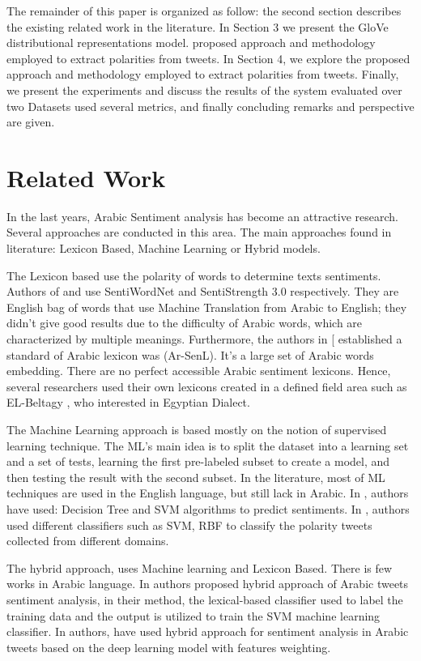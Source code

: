 \documentclass[conference]{IEEEtran}
\begin{document}
	The remainder of this paper is organized as follow: the second section describes the existing related work in the literature. In Section 3 we present the GloVe distributional representations model. proposed approach and methodology employed to extract polarities from tweets. In Section 4, we explore the proposed approach and methodology employed to extract polarities from tweets. Finally, we present the experiments and discuss the results of the system evaluated over two Datasets used several metrics, and finally concluding remarks and perspective are given.
	
	
	\section{Related Work}
	
	
	In the last years, Arabic Sentiment analysis has become an attractive research. Several approaches are conducted in   this area. The main approaches found in literature:  Lexicon Based, Machine Learning or Hybrid models. 
	
	The Lexicon based use the polarity of words to determine texts sentiments. Authors of \cite{8549704} and \cite{7975223} use SentiWordNet and SentiStrength 3.0 respectively. They are English bag of words that use Machine Translation from Arabic to English; they didn’t give good results due to the difficulty of Arabic words, which are characterized by multiple meanings. Furthermore, the authors in [\cite{8125054} established a standard of Arabic lexicon was (Ar-SenL). It’s a large set of Arabic words embedding. There are no perfect accessible Arabic sentiment lexicons. Hence, several researchers used their own lexicons created in a defined field area such as EL-Beltagy \cite{6544421}, who interested in Egyptian Dialect.
	
	The Machine Learning approach is based mostly on the notion of supervised learning technique. The ML's main idea is to split the dataset into a learning set and a set of tests, learning the first pre-labeled subset to create a model, and then testing the result with the second subset. In the literature, most of ML techniques are used in the English language, but still lack in Arabic. In \cite{8530517}, authors have used: Decision Tree and SVM algorithms to predict sentiments. In \cite{7514636}, authors used different classifiers such as SVM, RBF to classify the polarity tweets collected from different domains. 
	
	The hybrid approach, uses Machine learning and Lexicon Based. There is few works in Arabic language. In \cite{8250273} authors proposed hybrid approach of Arabic tweets sentiment analysis, in their method, the lexical-based classifier used to label the training data and the output is utilized to train the SVM machine learning classifier.
	In \cite{8706408} authors, have used hybrid approach for sentiment analysis in Arabic tweets based on the deep learning model with features weighting.
\end{document}
